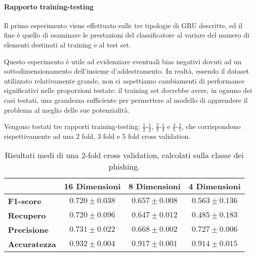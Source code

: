 \documentclass[../../main.tex]{subfiles}
\begin{document}
    \paragraph{Rapporto training-testing}
    Il primo esperimento viene effettuato sulle tre tipologie di GRU descritte, ed il fine è quello di esaminare le prestazioni del classificatore al variare del numero di elementi destinati al training e al test set. 
    
    Questo esperimento è utile ad evidenziare eventuali bias negativi dovuti ad un sottodimensionamento dell'insieme d'addestramento. In realtà, essendo il dataset utilizzato relativamente grande, non ci aspettiamo cambiamenti di performance significativi nelle proporzioni testate: il training set dovrebbe avere, in ognuno dei casi testati, una grandezza sufficiente per permettere al modello di apprendere il problema al meglio delle sue potenzialità.

    Vengono testati tre rapporti training-testing: $\frac{1}{2}$-$\frac{1}{2}$, $\frac{2}{3}$-$\frac{1}{3}$ e $\frac{4}{5}$-$\frac{1}{5}$, che corrispondono rispettivamente ad una 2 fold, 3 fold e 5 fold cross validation.

    \begin{table}[H]
        \centering
        \begin{tabular}{lccc}
            \toprule
            {} &                      \textbf{16 Dimensioni} & \textbf{8 Dimensioni} & \textbf{4 Dimensioni} \\
            \midrule
            \textbf{F1-score }      &      $0.720 \pm 0.038$ & $0.657 \pm 0.008$ & $0.563 \pm 0.136$\\
            \textbf{Recupero   }    &      $0.720 \pm 0.096$ & $0.647 \pm 0.012$ & $0.485 \pm 0.183$\\
            \textbf{Precisione}     &      $0.731 \pm 0.022$ & $0.668 \pm 0.002$ & $0.727 \pm 0.006$\\
            \textbf{Accuratezza }   &      $0.932 \pm 0.004$ & $0.917 \pm 0.001$ & $0.914 \pm 0.015$\\
            \bottomrule
        \end{tabular}
        \caption{Risultati medi di una 2-fold cross validation, calcolati sulla classe dei phishing.}
        \label{tab:2foldCV}
    \end{table}
\end{document}
